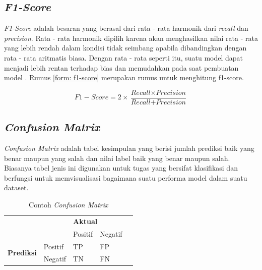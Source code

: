 \subsection{\textit{F1-Score}}

\textit{F1-Score} adalah besaran yang berasal dari rata - rata harmonik dari \textit{recall} dan \textit{precision}. Rata  - rata harmonik dipilih karena akan menghasilkan nilai rata - rata yang lebih rendah dalam kondisi tidak seimbang apabila dibandingkan dengan rata - rata aritmatis biasa. Dengan rata - rata seperti itu, suatu model dapat menjadi lebih rentan terhadap bias dan memudahkan pada saat pembuatan model \cite{metrics_ml}. Rumus \ref{form: f1-score} merupakan rumus untuk menghitung f1-score.

\begin{equation}
    \label{form: f1-score}
    F1-Score = 2 \times \frac{\textit{Recall} \times \textit{Precision}}{\textit{Recall} + \textit{Precision}}
\end{equation}

\subsection{\textit{Confusion Matrix}}

\textit{Confusion Matrix} adalah tabel kesimpulan yang berisi jumlah prediksi baik yang benar maupun yang salah dan nilai label baik yang benar maupun salah. Biasanya tabel jenis ini digunakan untuk tugas yang bersifat klasifikasi dan berfungsi untuk memvisualisasi bagaimana suatu performa model dalam suatu dataset.

\begin{table}
    \caption{Contoh \textit{Confusion Matrix}}
    \label{tab:cth_confusion_mtrx}
    \centering
    \begin{tabular}{|l|l|l|l|l}
        \cline{1-4}
        \multicolumn{2}{|l|}{\multirow{2}{*}{}} & \multicolumn{2}{l|}{\textbf{Aktual}} &                \\ \cline{3-4}
        \multicolumn{2}{|l|}{}                  & Positif                              & Negatif &      \\ \cline{1-4}
        \multirow{2}{*}{\textbf{Prediksi}}      & Positif                              & TP      & FP & \\ \cline{2-4}
                                                & Negatif                              & TN      & FN & \\ \cline{1-4}
    \end{tabular}
\end{table}

